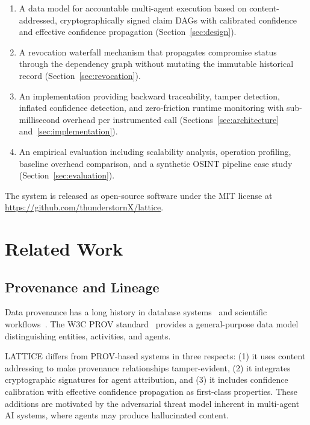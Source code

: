 \documentclass[11pt,twocolumn]{article}
\begin{document}
\begin{enumerate}[leftmargin=*,itemsep=2pt]
\item A data model for accountable multi-agent execution based on content-addressed, cryptographically signed claim DAGs with calibrated confidence and effective confidence propagation (Section~\ref{sec:design}).

\item A revocation waterfall mechanism that propagates compromise status through the dependency graph without mutating the immutable historical record (Section~\ref{sec:revocation}).

\item An implementation providing backward traceability, tamper detection, inflated confidence detection, and zero-friction runtime monitoring with sub-millisecond overhead per instrumented call (Sections~\ref{sec:architecture} and~\ref{sec:implementation}).

\item An empirical evaluation including scalability analysis, operation profiling, baseline overhead comparison, and a synthetic OSINT pipeline case study (Section~\ref{sec:evaluation}).
\end{enumerate}

The system is released as open-source software under the MIT license at \url{https://github.com/thunderstornX/lattice}.

\section{Related Work}

\subsection{Provenance and Lineage}

Data provenance has a long history in database systems~\cite{buneman2001provenance} and scientific workflows~\cite{freire2008provenance}. The W3C PROV standard~\cite{moreau2013prov} provides a general-purpose data model distinguishing entities, activities, and agents.

LATTICE differs from PROV-based systems in three respects: (1) it uses content addressing to make provenance relationships tamper-evident, (2) it integrates cryptographic signatures for agent attribution, and (3) it includes confidence calibration with effective confidence propagation as first-class properties. These additions are motivated by the adversarial threat model inherent in multi-agent AI systems, where agents may produce hallucinated content.
\end{document}
